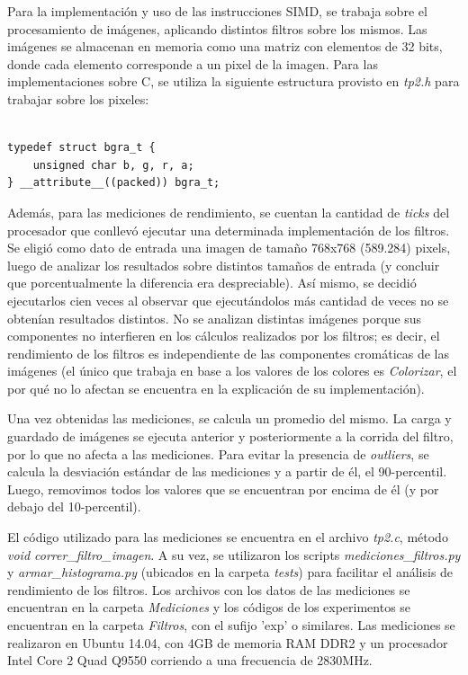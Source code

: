 \documentclass[a4paper]{article}
\newenvironment{codesnippet}{%
	\begin{Sbox}\begin{minipage}{\textwidth}\sffamily\small}%
	{\end{minipage}\end{Sbox}%
		\begin{center}%
		\vspace{-0.4cm}\colorbox{litegrey}{\TheSbox}\end{center}\vspace{0.3cm}}
\begin{document}
Para la implementación y uso de las instrucciones SIMD, se trabaja sobre el procesamiento de imágenes, aplicando distintos filtros sobre los mismos. Las imágenes se almacenan en memoria como una matriz con elementos de 32 bits, donde cada elemento corresponde a un pixel de la imagen. Para las implementaciones sobre C, se utiliza la siguiente estructura provisto en \textit{tp2.h} para trabajar sobre los pixeles:
\begin{codesnippet}
\begin{verbatim}

typedef struct bgra_t {
	unsigned char b, g, r, a;
} __attribute__((packed)) bgra_t;

\end{verbatim}
\end{codesnippet}

Además, para las mediciones de rendimiento, se cuentan la cantidad de \textit{ticks} del procesador que conllevó ejecutar una determinada implementación de los filtros. Se eligió como dato de entrada una imagen de tamaño 768x768 (589.284) pixels, luego de analizar los resultados sobre distintos tamaños de entrada (y concluir que porcentualmente la diferencia era despreciable). Así mismo, se decidió ejecutarlos cien veces al observar que ejecutándolos más cantidad de veces no se obtenían resultados distintos. No se analizan distintas imágenes porque sus componentes no interfieren en los cálculos realizados por los filtros; es decir, el rendimiento de los filtros es independiente de las componentes cromáticas de las imágenes (el único que trabaja en base a los valores de los colores es \textit{Colorizar}, el por qué no lo afectan se encuentra en la explicación de su implementación).

Una vez obtenidas las mediciones, se calcula un promedio del mismo. La carga y guardado de imágenes se ejecuta anterior y posteriormente a la corrida del filtro, por lo que no afecta a las mediciones. Para evitar la presencia de \textit{outliers}, se calcula la desviación estándar de las mediciones y a partir de él, el 90-percentil. Luego, removimos todos los valores que se encuentran por encima de él (y por debajo del 10-percentil).

El código utilizado para las mediciones se encuentra en el archivo \textit{tp2.c}, método \textit{void correr_filtro_imagen}. A su vez, se utilizaron los scripts \textit{mediciones_filtros.py} y \textit{armar_histograma.py} (ubicados en la carpeta \textit{tests}) para facilitar el análisis de rendimiento de los filtros. Los archivos con los datos de las mediciones se encuentran en la carpeta \textit{Mediciones} y los códigos de los experimentos se encuentran en la carpeta \textit{Filtros}, con el sufijo 'exp' o similares.
Las mediciones se realizaron en Ubuntu 14.04, con 4GB de memoria RAM DDR2 y un procesador Intel Core 2 Quad Q9550 corriendo a una frecuencia de 2830MHz.
\newpage
\end{document}
